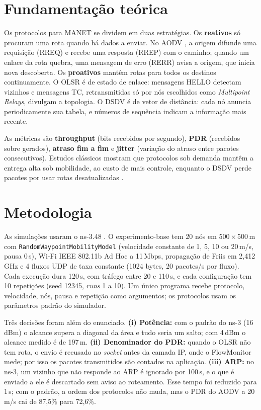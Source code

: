 \documentclass[12pt]{article}
\begin{document}
\section{Fundamentação teórica}

Os protocolos para MANET se dividem em duas estratégias. Os \textbf{reativos} só procuram
uma rota quando há dados a enviar. No AODV \cite{rfc3561}, a origem difunde uma requisição
(RREQ) e recebe uma resposta (RREP) com o caminho; quando um enlace da rota quebra, uma
mensagem de erro (RERR) avisa a origem, que inicia nova descoberta. Os \textbf{proativos}
mantêm rotas para todos os destinos continuamente. O OLSR \cite{rfc3626} é de estado de
enlace: mensagens HELLO detectam vizinhos e mensagens TC, retransmitidas só por nós
escolhidos como \emph{Multipoint Relays}, divulgam a topologia. O DSDV
\cite{perkins1994dsdv} é de vetor de distância: cada nó anuncia periodicamente sua tabela,
e números de sequência indicam a informação mais recente.

As métricas são \textbf{throughput} (bits recebidos por segundo), \textbf{PDR} (recebidos
sobre gerados), \textbf{atraso fim a fim} e \textbf{jitter} (variação do atraso entre
pacotes consecutivos). Estudos clássicos mostram que protocolos sob demanda mantêm a
entrega alta sob mobilidade, ao custo de mais controle, enquanto o DSDV perde pacotes por
usar rotas desatualizadas \cite{broch1998,johansson1999}.

\section{Metodologia}

As simulações usaram o ns-3.48 \cite{ns3docs}. O experimento-base tem 20 nós em
500\,$\times$\,500\,m com \texttt{RandomWaypointMobilityModel} (velocidade constante de 1,
5, 10 ou 20\,m/s, pausa 0\,s), Wi-Fi IEEE 802.11b Ad Hoc a 11\,Mbps, propagação de Friis
em 2,412\,GHz e 4 fluxos UDP de taxa constante (1024 bytes, 20 pacotes/s por fluxo). Cada
execução dura 120\,s, com tráfego entre 20 e 110\,s, e cada configuração tem 10 repetições
(seed 12345, \emph{runs} 1 a 10). Um único programa recebe protocolo, velocidade, nós,
pausa e repetição como argumentos; os protocolos usam os parâmetros padrão do simulador.

Três decisões foram além do enunciado. \textbf{(i) Potência:} com o padrão do ns-3
(16\,dBm) o alcance supera a diagonal da área e tudo seria um salto; com 4\,dBm o alcance
medido é de 197\,m. \textbf{(ii) Denominador do PDR:} quando o OLSR não tem rota, o envio é
recusado no \emph{socket} antes da camada IP, onde o FlowMonitor \cite{carneiro2009} mede;
por isso os pacotes transmitidos são contados na aplicação. \textbf{(iii) ARP:} no ns-3,
um vizinho que não responde ao ARP é ignorado por 100\,s, e o que é enviado a ele é
descartado sem aviso ao roteamento. Esse tempo foi reduzido para 1\,s; com o padrão, a
ordem dos protocolos não muda, mas o PDR do AODV a 20\,m/s cai de 87,5\% para 72,6\%.
\end{document}
